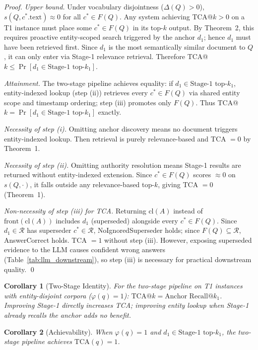 \documentclass[11pt]{article}
\newtheorem{corollary}{Corollary}
\begin{document}
\begin{proof}
\emph{Upper bound.} Under vocabulary disjointness ($\Delta(Q) > 0$), $s(Q, c^*.\text{text}) \approx 0$ for all $c^* \in F(Q)$. Any system achieving TCA@$k > 0$ on a T1 instance must place some $c^* \in F(Q)$ in its top-$k$ output. By Theorem~2, this requires proactive entity-scoped search triggered by the anchor $d_1$; hence $d_1$ must have been retrieved first. Since $d_1$ is the most semantically similar document to $Q$, it can only enter via Stage-1 relevance retrieval. Therefore TCA@$k \leq \Pr[d_1 \in \text{Stage-1 top-}k_1]$.

\emph{Attainment.} The two-stage pipeline achieves equality: if $d_1 \in \text{Stage-1 top-}k_1$, entity-indexed lookup (step (ii)) retrieves every $c^* \in F(Q)$ via shared entity scope and timestamp ordering; step (iii) promotes only $F(Q)$. Thus TCA@$k = \Pr[d_1 \in \text{Stage-1 top-}k_1]$ exactly.

\emph{Necessity of step (i).} Omitting anchor discovery means no document triggers entity-indexed lookup. Then retrieval is purely relevance-based and TCA $= 0$ by Theorem~1.

\emph{Necessity of step (ii).} Omitting authority resolution means Stage-1 results are returned without entity-indexed extension. Since $c^* \in F(Q)$ scores $\approx 0$ on $s(Q,\cdot)$, it falls outside any relevance-based top-$k$, giving TCA $= 0$ (Theorem~1).

\emph{Non-necessity of step (iii) for TCA.} Returning $\mathrm{cl}(A)$ instead of $\mathrm{front}(\mathrm{cl}(A))$ includes $d_1$ (superseded) alongside every $c^* \in F(Q)$. Since $d_1 \in \mathcal{R}$ has superseder $c^* \in \mathcal{R}$, NoIgnoredSuperseder holds; since $F(Q) \subseteq \mathcal{R}$, AnswerCorrect holds. TCA $= 1$ without step (iii). However, exposing superseded evidence to the LLM causes confident wrong answers (Table~\ref{tab:llm_downstream}), so step (iii) is necessary for practical downstream quality. \qed
\end{proof}

\begin{corollary}[Two-Stage Identity]
\label{cor:identity}
For the two-stage pipeline on T1 instances with entity-disjoint corpora ($\varphi(q) = 1$):
$\text{TCA@}k = \text{Anchor Recall@}k_1$.
Improving Stage-1 directly increases TCA; improving entity lookup when Stage-1 already recalls the anchor adds no benefit.
\end{corollary}

\begin{corollary}[Achievability]
\label{cor:achieve}
When $\varphi(q) = 1$ and $d_1 \in \text{Stage-1 top-}k_1$, the two-stage pipeline achieves $\mathrm{TCA}(q) = 1$.
\end{corollary}
\end{document}
